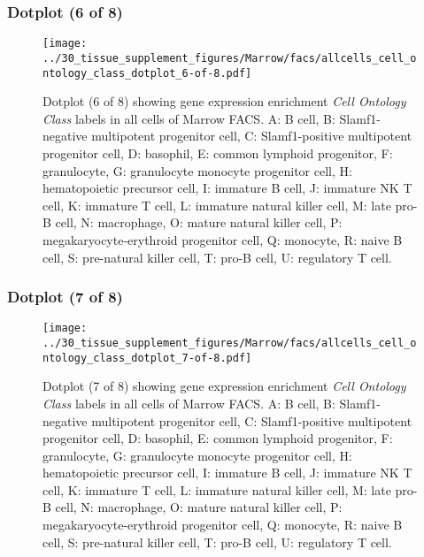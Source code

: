 \subsubsection{Dotplot (6 of 8)}
\begin{figure}[h]
\centering
\texttt{[image: ../30\_tissue\_supplement\_figures/Marrow/facs/allcells\_cell\_ontology\_class\_dotplot\_6-of-8.pdf]}

\caption{ Dotplot (6 of 8)  showing gene expression enrichment \emph{Cell Ontology Class} labels in all cells of Marrow FACS. A: B cell, B: Slamf1-negative multipotent progenitor cell, C: Slamf1-positive multipotent progenitor cell, D: basophil, E: common lymphoid progenitor, F: granulocyte, G: granulocyte monocyte progenitor cell, H: hematopoietic precursor cell, I: immature B cell, J: immature NK T cell, K: immature T cell, L: immature natural killer cell, M: late pro-B cell, N: macrophage, O: mature natural killer cell, P: megakaryocyte-erythroid progenitor cell, Q: monocyte, R: naive B cell, S: pre-natural killer cell, T: pro-B cell, U: regulatory T cell.}
\end{figure}


\clearpage

\subsubsection{Dotplot (7 of 8)}
\begin{figure}[h]
\centering
\texttt{[image: ../30\_tissue\_supplement\_figures/Marrow/facs/allcells\_cell\_ontology\_class\_dotplot\_7-of-8.pdf]}

\caption{ Dotplot (7 of 8)  showing gene expression enrichment \emph{Cell Ontology Class} labels in all cells of Marrow FACS. A: B cell, B: Slamf1-negative multipotent progenitor cell, C: Slamf1-positive multipotent progenitor cell, D: basophil, E: common lymphoid progenitor, F: granulocyte, G: granulocyte monocyte progenitor cell, H: hematopoietic precursor cell, I: immature B cell, J: immature NK T cell, K: immature T cell, L: immature natural killer cell, M: late pro-B cell, N: macrophage, O: mature natural killer cell, P: megakaryocyte-erythroid progenitor cell, Q: monocyte, R: naive B cell, S: pre-natural killer cell, T: pro-B cell, U: regulatory T cell.}
\end{figure}


\clearpage

